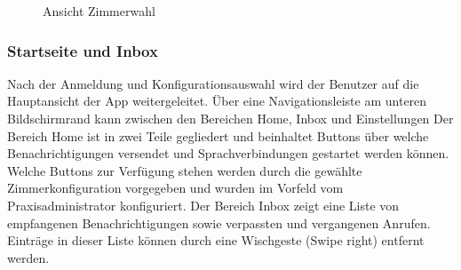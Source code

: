 \begin{figure}[h]
\begin{minipage}[b]{0.45\textwidth}
        \caption{Ansicht Zimmerwahl }
    \end{minipage}

    \label{fig:MobileClient-Screens1}

\end{figure}

\clearpage

\subsubsection*{Startseite und Inbox}

Nach der Anmeldung und Konfigurationsauswahl wird der Benutzer auf die Hauptansicht der App weitergeleitet.
Über eine Navigationsleiste am unteren Bildschirmrand kann zwischen den Bereichen Home, Inbox und Einstellungen
Der Bereich Home ist in zwei Teile gegliedert und beinhaltet Buttons über welche Benachrichtigungen versendet und Sprachverbindungen gestartet werden können.
Welche Buttons zur Verfügung stehen werden durch die gewählte Zimmerkonfiguration vorgegeben und wurden im Vorfeld vom Praxisadministrator konfiguriert.
Der Bereich Inbox zeigt eine Liste von empfangenen Benachrichtigungen sowie verpassten und vergangenen Anrufen.
Einträge in dieser Liste können durch eine Wischgeste (Swipe right) entfernt werden.

